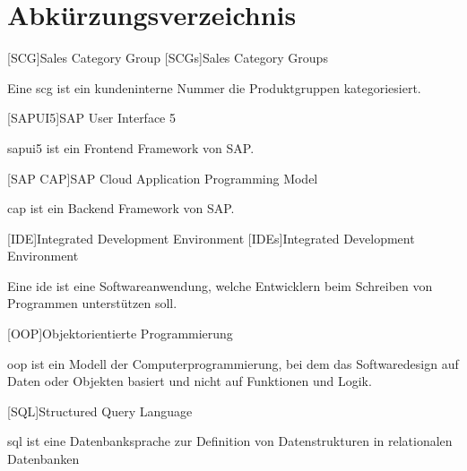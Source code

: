 \chapter*{Abkürzungsverzeichnis}
\begin{acronym}
    [SCG]{Sales Category Group} 
    [SCGs]{Sales Category Groups}
\end{acronym}
Eine \ac{scg} ist ein kundeninterne Nummer die Produktgruppen kategoriesiert. 

\begin{acronym}
    [SAPUI5]{SAP User Interface 5}
\end{acronym}
\acs{sapui5} ist ein Frontend Framework von SAP.

\begin{acronym}
    [SAP CAP]{SAP Cloud Application Programming Model}
\end{acronym}
\acs{cap} ist ein Backend Framework von SAP.

\begin{acronym}
    [IDE]{Integrated Development Environment}
    [IDEs]{Integrated Development Environment}
\end{acronym}
Eine \ac{ide} ist eine Softwareanwendung, welche Entwicklern beim Schreiben von Programmen unterstützen soll.

\begin{acronym}
    [OOP]{Objektorientierte Programmierung}
\end{acronym}
\ac{oop} ist ein Modell der Computerprogrammierung, bei dem das Softwaredesign auf Daten oder Objekten basiert und nicht auf Funktionen und Logik.

\begin{acronym} 
    [SQL]{Structured Query Language}
\end{acronym}
\acs{sql} ist eine Datenbanksprache zur Definition von Datenstrukturen in relationalen Datenbanken